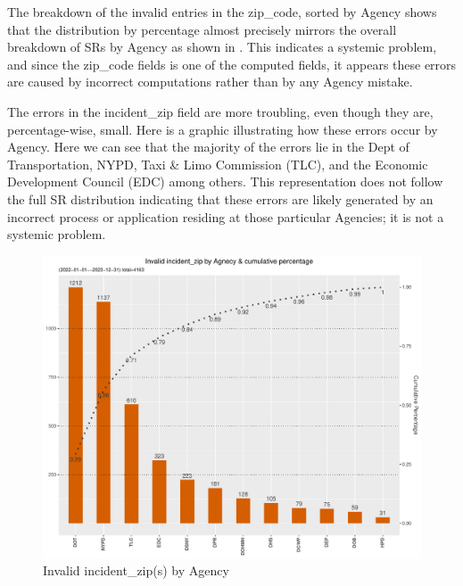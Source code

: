 \documentclass[12pt, titlepage]{article}
\begin{document}
	The breakdown of the invalid entries in the zip\_code, sorted by 
	Agency shows that the distribution by percentage almost precisely 
	mirrors the overall breakdown of SRs by Agency as shown in . 
	This indicates a systemic problem, and since the zip\_code fields is 
	one of the computed fields, it appears these errors are caused by 
	incorrect computations rather than by any Agency mistake.
	
	The  errors in the incident\_zip field are more troubling, even though 
	they are, percentage-wise, small. Here is a graphic illustrating how 
	these errors occur by Agency. Here we can see that the majority of 
	the errors lie in the Dept of Transportation, NYPD, Taxi \& Limo 
	Commission (TLC), and the Economic Development Council (EDC) 
	among others. This representation does not follow the full SR 
	distribution indicating that these errors are likely generated by 
	an incorrect process or application residing at those particular 
	Agencies; it is not a systemic problem.

	\begin{figure}[tbp]
		\centering
		\includegraphics[width=\textwidth]{invalid_incident_zip.pdf}
		\caption{Invalid incident\_zip(s) by Agency} 
		\label{fig:invalid_incident_zip}
	\end{figure}
	
\end{document}

